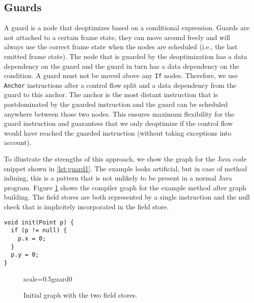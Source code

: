 \documentclass[twocolumn]{svjour3}
\begin{document}
\subsection{Guards}
A guard is a node that deoptimizes based on a conditional expression.
Guards are not attached to a certain frame state, they can move around freely and will always use the correct frame state when the nodes are scheduled (i.e., the last emitted frame state).
The node that is guarded by the deoptimization has a data dependency on the guard and the guard in turn has a data dependency on the condition.
A guard must not be moved above any \texttt{If} nodes.
Therefore, we use \texttt{Anchor} instructions after a control flow split and a data dependency from the guard to this anchor.
The anchor is the most distant instruction that is postdominated by the guarded instruction and the guard can be scheduled anywhere between those two nodes.
This ensures maximum flexibility for the guard instruction and guarantees that we only deoptimize if the control flow would have reached the guarded instruction (without taking exceptions into account).

To illustrate the strengths of this approach, we show the graph for the Java code snippet shown in \ref{lst:guard1}.
The example looks artificial, but in case of method inlining, this is a pattern that is not unlikely to be present in a normal Java program.
Figure \ref{fig:guard0} shows the compiler graph for the example method after graph building.
The field stores are both represented by a single instruction and the null check that is implicitely incorporated in the field store.

\begin{lstlisting}[label=lst:guard1, caption=Example method that demonstrates the strengths of modelling the guards explicitely., captionpos=b]
void init(Point p) {
  if (p != null) {
    p.x = 0;
  }
  p.y = 0;
}
\end{lstlisting}

\begin{figure}[h]
  \centering
\begin{digraphenv}{scale=0.5}{guard0}
\end{digraphenv}
  \caption{Initial graph with the two field stores.}
  \label{fig:guard0}
\end{figure}
\end{document}
